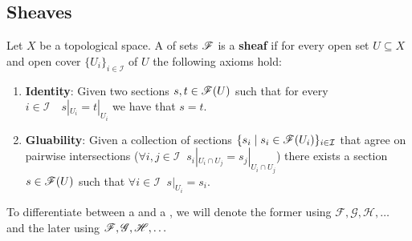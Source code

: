 \documentclass[../main.tex]{subfiles}
\begin{document}
\subsection{Sheaves}
\begin{definition}[Sheaf] \label{def:sheaf}
  Let \(X\) be a topological space.
  A  of sets \(\mathscr{F}\) is a \textbf{sheaf} if for every open set \(U \subseteq X\) and open cover \(\{U_{i}\}_{i \in \mathcal{I}}\) of \(U\) the following axioms hold:
  \begin{enumerate}[label=SH.\arabic*), ref=SH.\arabic*]
    \item\label{axiom:sheaf-identity} \textbf{Identity}: Given two sections \(s, t \in \mathscr{F}(U)\) such that for every \(i \in \mathcal{I} \quad s|_{U_{i}} = t|_{U_{i}}\) we have that \(s = t\).
    \item\label{axiom:sheaf-gluability} \textbf{Gluability}: Given a collection of sections \(\{s_{i} \mid s_{i} \in \mathscr{F}(U_{i})\}_{i \in \mathcal{I}}\) that agree on pairwise intersections (\(\forall i, j \in \mathcal{I} \;\; s_{i}|_{U_{i} \cap U_{j}} = s_{j}|_{U_{i} \cap U_{j}}\)) there exists a section \(s \in \mathscr{F}(U)\) such that \(\forall i \in \mathcal{I} \;\; s|_{U_{i}} = s_{i}\).
  \end{enumerate}
\end{definition}

\begin{notation}
  To differentiate between a  and a , we will denote the former using \(\mathcal{F}, \mathcal{G}, \mathcal{H}, \ldots\) and the later using \(\mathscr{F}, \mathscr{G}, \mathscr{H}, \ldots\)
\end{notation}
\end{document}
